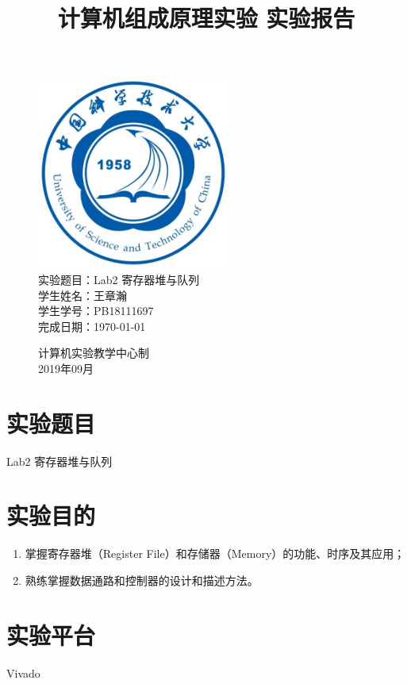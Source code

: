 \documentclass[UTF8]{article}
\title{计算机组成原理实验 实验报告}
\date{}
\begin{document}
\maketitle
\begin{figure}[H]
	\centering
	\includegraphics[width=2.5in]{xiaohui.png}\vspace{0.5cm}\\
	\large{
		实验题目：Lab2 寄存器堆与队列\\
		学生姓名：王章瀚\\
		学生学号：PB18111697\\
		完成日期：\today\\
	}\vspace{2cm}
	
	\large{计算机实验教学中心制\\2019年09月\\}
	\thispagestyle{empty}
	\clearpage  %
\end{figure}
\newpage

\section{实验题目}
Lab2 寄存器堆与队列

\section{实验目的}
\begin{enumerate}
	\item 掌握寄存器堆（Register File）和存储器（Memory）的功能、时序及其应用；
	\item 熟练掌握数据通路和控制器的设计和描述方法。
\end{enumerate}

\section{实验平台}
Vivado
\end{document}
